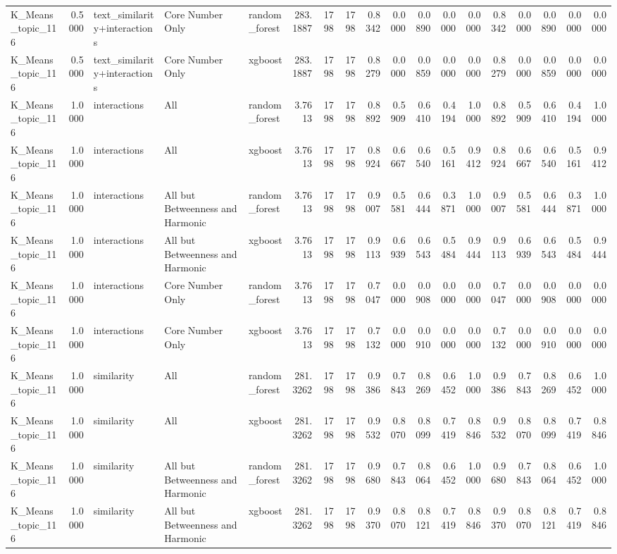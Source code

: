 \begin{tabular}{lrlllrrrrrrrrrrrrr}
K_Means_topic_116 & 0.5000 & text_similarity+interactions & Core Number Only & random_forest & 283.1887 & 1798 & 1798 & 0.8342 & 0.0000 & 0.0890 & 0.0000 & 0.0000 & 0.8342 & 0.0000 & 0.0890 & 0.0000 & 0.0000 \\
K_Means_topic_116 & 0.5000 & text_similarity+interactions & Core Number Only & xgboost & 283.1887 & 1798 & 1798 & 0.8279 & 0.0000 & 0.0859 & 0.0000 & 0.0000 & 0.8279 & 0.0000 & 0.0859 & 0.0000 & 0.0000 \\
K_Means_topic_116 & 1.0000 & interactions & All & random_forest & 3.7613 & 1798 & 1798 & 0.8892 & 0.5909 & 0.6410 & 0.4194 & 1.0000 & 0.8892 & 0.5909 & 0.6410 & 0.4194 & 1.0000 \\
K_Means_topic_116 & 1.0000 & interactions & All & xgboost & 3.7613 & 1798 & 1798 & 0.8924 & 0.6667 & 0.6540 & 0.5161 & 0.9412 & 0.8924 & 0.6667 & 0.6540 & 0.5161 & 0.9412 \\
K_Means_topic_116 & 1.0000 & interactions & All but Betweenness and Harmonic & random_forest & 3.7613 & 1798 & 1798 & 0.9007 & 0.5581 & 0.6444 & 0.3871 & 1.0000 & 0.9007 & 0.5581 & 0.6444 & 0.3871 & 1.0000 \\
K_Means_topic_116 & 1.0000 & interactions & All but Betweenness and Harmonic & xgboost & 3.7613 & 1798 & 1798 & 0.9113 & 0.6939 & 0.6543 & 0.5484 & 0.9444 & 0.9113 & 0.6939 & 0.6543 & 0.5484 & 0.9444 \\
K_Means_topic_116 & 1.0000 & interactions & Core Number Only & random_forest & 3.7613 & 1798 & 1798 & 0.7047 & 0.0000 & 0.0908 & 0.0000 & 0.0000 & 0.7047 & 0.0000 & 0.0908 & 0.0000 & 0.0000 \\
K_Means_topic_116 & 1.0000 & interactions & Core Number Only & xgboost & 3.7613 & 1798 & 1798 & 0.7132 & 0.0000 & 0.0910 & 0.0000 & 0.0000 & 0.7132 & 0.0000 & 0.0910 & 0.0000 & 0.0000 \\
K_Means_topic_116 & 1.0000 & similarity & All & random_forest & 281.3262 & 1798 & 1798 & 0.9386 & 0.7843 & 0.8269 & 0.6452 & 1.0000 & 0.9386 & 0.7843 & 0.8269 & 0.6452 & 1.0000 \\
K_Means_topic_116 & 1.0000 & similarity & All & xgboost & 281.3262 & 1798 & 1798 & 0.9532 & 0.8070 & 0.8099 & 0.7419 & 0.8846 & 0.9532 & 0.8070 & 0.8099 & 0.7419 & 0.8846 \\
K_Means_topic_116 & 1.0000 & similarity & All but Betweenness and Harmonic & random_forest & 281.3262 & 1798 & 1798 & 0.9680 & 0.7843 & 0.8064 & 0.6452 & 1.0000 & 0.9680 & 0.7843 & 0.8064 & 0.6452 & 1.0000 \\
K_Means_topic_116 & 1.0000 & similarity & All but Betweenness and Harmonic & xgboost & 281.3262 & 1798 & 1798 & 0.9370 & 0.8070 & 0.8121 & 0.7419 & 0.8846 & 0.9370 & 0.8070 & 0.8121 & 0.7419 & 0.8846 \\

\end{tabular}
